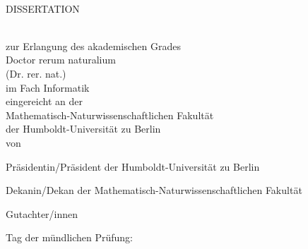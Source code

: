 \begin{titlepage}
\vspace*{2cm}
\makeatletter
\begin{center}
\begin{Huge}
  \@title
\end{Huge}\\
%
\vspace{1cm}
%
\begin{Large}
    DISSERTATION
\end{Large}\\
%
\vspace{1cm}
%
zur Erlangung des akademischen Grades\\
Doctor rerum naturalium\\
(Dr. rer. nat.)\\
im Fach Informatik\\
%
\vspace{5mm}
%
eingereicht an der\\
Mathematisch-Naturwissenschaftlichen Fakult\"at\\
der Humboldt-Universit\"at zu Berlin\\
%
\vspace{5mm}
%
von\\
%
\@author

\end{center}
\vfill
{\setlength{\parindent}{0mm}
%
Pr\"asidentin/Pr\"asident der Humboldt-Universit\"at zu Berlin\\
\@HUpresident

\vspace{\baselineskip}
Dekanin/Dekan der Mathematisch-Naturwissenschaftlichen Fakult\"at\\
\@HUdean

\vspace{5mm}
Gutachter/innen
\begin{compactenum}
\item\@firstReviewer
\item\@secondReviewer
\item\@thirdReviewer
\end{compactenum}
%
\vspace{\baselineskip}
Tag der m\"undlichen Pr\"ufung: \@date
\makeatother
}
\end{titlepage}

\newpage
\null
\thispagestyle{empty}
\newpage
